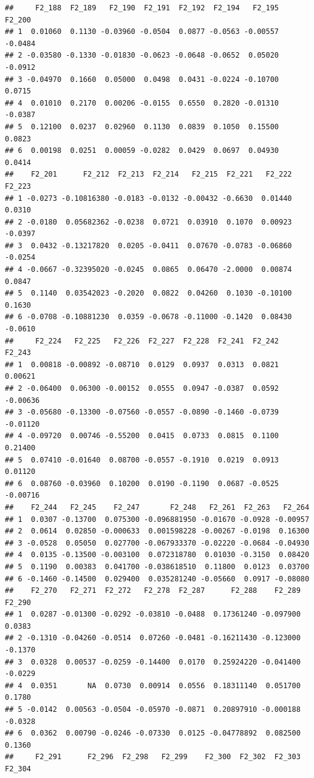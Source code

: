 \documentclass[]{article}
\begin{document}
\begin{verbatim}
##     F2_188  F2_189   F2_190  F2_191  F2_192  F2_194   F2_195  F2_200
## 1  0.01060  0.1130 -0.03960 -0.0504  0.0877 -0.0563 -0.00557 -0.0484
## 2 -0.03580 -0.1330 -0.01830 -0.0623 -0.0648 -0.0652  0.05020 -0.0912
## 3 -0.04970  0.1660  0.05000  0.0498  0.0431 -0.0224 -0.10700  0.0715
## 4  0.01010  0.2170  0.00206 -0.0155  0.6550  0.2820 -0.01310 -0.0387
## 5  0.12100  0.0237  0.02960  0.1130  0.0839  0.1050  0.15500  0.0823
## 6  0.00198  0.0251  0.00059 -0.0282  0.0429  0.0697  0.04930  0.0414
##    F2_201      F2_212  F2_213  F2_214   F2_215  F2_221   F2_222  F2_223
## 1 -0.0273 -0.10816380 -0.0183 -0.0132 -0.00432 -0.6630  0.01440  0.0310
## 2 -0.0180  0.05682362 -0.0238  0.0721  0.03910  0.1070  0.00923 -0.0397
## 3  0.0432 -0.13217820  0.0205 -0.0411  0.07670 -0.0783 -0.06860 -0.0254
## 4 -0.0667 -0.32395020 -0.0245  0.0865  0.06470 -2.0000  0.00874  0.0847
## 5  0.1140  0.03542023 -0.2020  0.0822  0.04260  0.1030 -0.10100  0.1630
## 6 -0.0708 -0.10881230  0.0359 -0.0678 -0.11000 -0.1420  0.08430 -0.0610
##     F2_224   F2_225   F2_226  F2_227  F2_228  F2_241  F2_242   F2_243
## 1  0.00818 -0.00892 -0.08710  0.0129  0.0937  0.0313  0.0821  0.00621
## 2 -0.06400  0.06300 -0.00152  0.0555  0.0947 -0.0387  0.0592 -0.00636
## 3 -0.05680 -0.13300 -0.07560 -0.0557 -0.0890 -0.1460 -0.0739 -0.01120
## 4 -0.09720  0.00746 -0.55200  0.0415  0.0733  0.0815  0.1100  0.21400
## 5  0.07410 -0.01640  0.08700 -0.0557 -0.1910  0.0219  0.0913  0.01120
## 6  0.08760 -0.03960  0.10200  0.0190 -0.1190  0.0687 -0.0525 -0.00716
##    F2_244   F2_245    F2_247       F2_248   F2_261  F2_263   F2_264
## 1  0.0307 -0.13700  0.075300 -0.096881950 -0.01670 -0.0928 -0.00957
## 2  0.0614  0.02850 -0.000633  0.001598228 -0.00267 -0.0198  0.16300
## 3 -0.0528  0.05050  0.027700 -0.067933370 -0.02220 -0.0684 -0.04930
## 4  0.0135 -0.13500 -0.003100  0.072318780  0.01030 -0.3150  0.08420
## 5  0.1190  0.00383  0.041700 -0.038618510  0.11800  0.0123  0.03700
## 6 -0.1460 -0.14500  0.029400  0.035281240 -0.05660  0.0917 -0.08080
##    F2_270   F2_271  F2_272   F2_278  F2_287      F2_288    F2_289  F2_290
## 1  0.0287 -0.01300 -0.0292 -0.03810 -0.0488  0.17361240 -0.097900  0.0383
## 2 -0.1310 -0.04260 -0.0514  0.07260 -0.0481 -0.16211430 -0.123000 -0.1370
## 3  0.0328  0.00537 -0.0259 -0.14400  0.0170  0.25924220 -0.041400 -0.0229
## 4  0.0351       NA  0.0730  0.00914  0.0556  0.18311140  0.051700  0.1780
## 5 -0.0142  0.00563 -0.0504 -0.05970 -0.0871  0.20897910 -0.000188 -0.0328
## 6  0.0362  0.00790 -0.0246 -0.07330  0.0125 -0.04778892  0.082500  0.1360
##     F2_291      F2_296  F2_298   F2_299    F2_300  F2_302  F2_303  F2_304

\end{verbatim}
\end{document}
